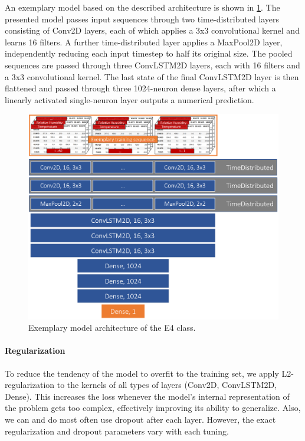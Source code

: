 An exemplary model based on the described architecture is shown in \cref{fig:e4_architecture}. The presented model passes input sequences through two time-distributed layers consisting of Conv2D layers, each of which applies a 3x3 convolutional kernel and learns 16 filters. A further time-distributed layer applies a MaxPool2D layer, independently reducing each input timestep to half its original size. The pooled sequences are passed through three ConvLSTM2D layers, each with 16 filters and a 3x3 convolutional kernel. The last state of the final ConvLSTM2D layer is then flattened and passed through three 1024-neuron dense layers, after which a linearly activated single-neuron layer outputs a numerical prediction.

\begin{figure}[h!]
  \centering
  \includegraphics[width=0.9\linewidth]{./99_appendix/img/E4_architecture}
  \caption{Exemplary model architecture of the E4 class.}
  \label{fig:e4_architecture}
\end{figure}

\paragraph{Regularization} To reduce the tendency of the model to overfit to the training set, we apply L2-regularization to the kernels of all types of layers (Conv2D, ConvLSTM2D, Dense). This increases the loss whenever the model's internal representation of the problem gets too complex, effectively improving its ability to generalize. Also, we can and do most often use dropout after each layer. However, the exact regularization and dropout parameters vary with each tuning.

